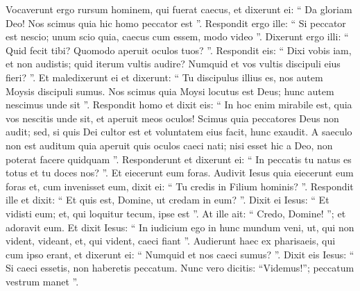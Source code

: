 \begin{biblechapter}
\begin{biblechapter}
\begin{biblechapter}
\begin{biblechapter}
\begin{biblechapter}
\begin{biblechapter}
\begin{biblechapter}
\begin{biblechapter}
\begin{biblechapter}
 \verse Vocaverunt ergo rursum hominem, qui fuerat caecus, et dixerunt ei: “ Da gloriam Deo! Nos scimus quia hic homo peccator est ”. 
\verse Respondit ergo ille: “ Si peccator est nescio; unum scio quia, caecus cum essem, modo video ”. 
 \verse Dixerunt ergo illi: “ Quid fecit tibi? Quomodo aperuit oculos tuos? ”. 
\verse Respondit eis: “ Dixi vobis iam, et non audistis; quid iterum vultis audire? Numquid et vos vultis discipuli eius fieri? ”. 
\verse Et maledixerunt ei et dixerunt: “ Tu discipulus illius es, nos autem Moysis discipuli sumus. 
\verse Nos scimus quia Moysi locutus est Deus; hunc autem nescimus unde sit ”. 
\verse Respondit homo et dixit eis: “ In hoc enim mirabile est, quia vos nescitis unde sit, et aperuit meos oculos! 
\verse Scimus quia peccatores Deus non audit; sed, si quis Dei cultor est et voluntatem eius facit, hunc exaudit. 
\verse A saeculo non est auditum quia aperuit quis oculos caeci nati; 
\verse nisi esset hic a Deo, non poterat facere quidquam ”. 
\verse Responderunt et dixerunt ei: “ In peccatis tu natus es totus et tu doces nos? ”. Et eiecerunt eum foras.
 \verse Audivit Iesus quia eiecerunt eum foras et, cum invenisset eum, dixit ei: “ Tu credis in Filium hominis? ”. 
\verse Respondit ille et dixit: “ Et quis est, Domine, ut credam in eum? ”. 
\verse Dixit ei Iesus: “ Et vidisti eum; et, qui loquitur tecum, ipse est ”. 
\verse At ille ait: “ Credo, Domine! ”; et adoravit eum. 
\verse Et dixit Iesus: “ In iudicium ego in hunc mundum veni, ut, qui non vident, videant, et, qui vident, caeci fiant ”. 
\verse Audierunt haec ex pharisaeis, qui cum ipso erant, et dixerunt ei: “ Numquid et nos caeci sumus? ”. 
 \verse Dixit eis Iesus: “ Si caeci essetis, non haberetis peccatum. Nunc vero dicitis: “Videmus!”; peccatum vestrum manet ”.
 

\end{biblechapter}
\end{biblechapter}
\end{biblechapter}
\end{biblechapter}
\end{biblechapter}
\end{biblechapter}
\end{biblechapter}
\end{biblechapter}
\end{biblechapter}
